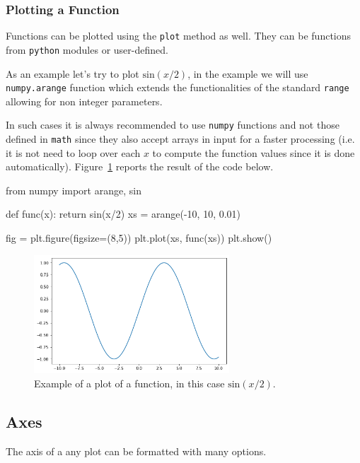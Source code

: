 \begin{ipython}
\subsubsection{Plotting a Function}\label{plotting-a-function}

Functions can be plotted using the \texttt{plot} method as well. They can be
functions from \texttt{python} modules or user-defined.

As an example let's try to plot \(\mathrm{sin}(x/2)\), in the example we
will use \texttt{numpy.arange} function which extends the functionalities
of the standard \texttt{range} allowing for non integer parameters.

In such cases it is always recommended to use \texttt{numpy} functions
and not those defined in \texttt{math} since they also accept arrays in
input for a faster processing (i.e. it is not need to loop over each
\(x\) to compute the function values since it is done automatically).
Figure~\ref{fig:sinx_x} reports the result of the code below.

\begin{ipython}
from numpy import arange, sin

def func(x):
    return sin(x/2)
xs = arange(-10, 10, 0.01)

fig = plt.figure(figsize=(8,5))
plt.plot(xs, func(xs))
plt.show()
\end{ipython}

\begin{figure}[htb]
	\centering
	\includegraphics[width=0.65\textwidth]{figures/sinx_x}
	\caption{Example of a plot of a function, in this case \(\mathrm{sin}(x/2)\).}
	\label{fig:sinx_x}
\end{figure}

\subsection{Axes}\label{axes}

The axis of a any plot can be formatted with many options.


\end{ipython}
